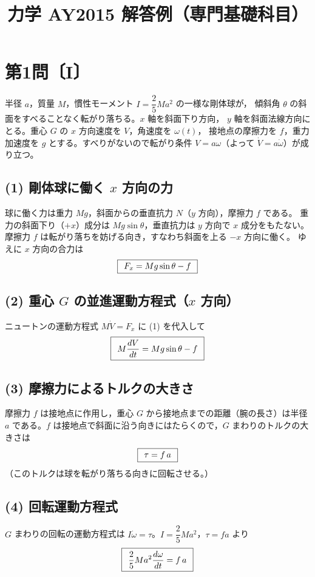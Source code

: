 \documentclass[11pt,a4paper]{article}
\title{力学 AY2015 解答例（専門基礎科目）}
\author{}
\date{}
\begin{document}
\maketitle

\section*{第1問〔I〕}

半径 $a$，質量 $M$，慣性モーメント $I=\dfrac{2}{5}Ma^2$ の一様な剛体球が，
傾斜角 $\theta$ の斜面をすべることなく転がり落ちる。$x$ 軸を斜面下り方向，
$y$ 軸を斜面法線方向にとる。重心 $G$ の $x$ 方向速度を $V$，角速度を $\omega(t)$，
接地点の摩擦力を $f$，重力加速度を $g$ とする。すべりがないので転がり条件
$V=a\omega$（よって $\dot V=a\dot\omega$）が成り立つ。

\subsection*{(1) 剛体球に働く $x$ 方向の力}
球に働く力は重力 $Mg$，斜面からの垂直抗力 $N$（$y$ 方向），摩擦力 $f$ である。
重力の斜面下り（$+x$）成分は $Mg\sin\theta$，垂直抗力は $y$ 方向で $x$ 成分をもたない。
摩擦力 $f$ は転がり落ちを妨げる向き，すなわち斜面を上る $-x$ 方向に働く。
ゆえに $x$ 方向の合力は
\[
  \boxed{\,\;F_x = Mg\sin\theta - f\;\,}
\]

\subsection*{(2) 重心 $G$ の並進運動方程式（$x$ 方向）}
ニュートンの運動方程式 $M\dot V = F_x$ に (1) を代入して
\[
  \boxed{\,\;M\dfrac{dV}{dt} = Mg\sin\theta - f\;\,}
\]

\subsection*{(3) 摩擦力によるトルクの大きさ}
摩擦力 $f$ は接地点に作用し，重心 $G$ から接地点までの距離（腕の長さ）は半径 $a$
である。$f$ は接地点で斜面に沿う向きにはたらくので，$G$ まわりのトルクの大きさは
\[
  \boxed{\,\;\tau = f\,a\;\,}
\]
（このトルクは球を転がり落ちる向きに回転させる。）

\subsection*{(4) 回転運動方程式}
$G$ まわりの回転の運動方程式は $I\dot\omega = \tau$。$I=\dfrac{2}{5}Ma^2$，$\tau=fa$ より
\[
  \boxed{\,\;\dfrac{2}{5}Ma^2\dfrac{d\omega}{dt} = f\,a\;\,}
\]
\end{document}
